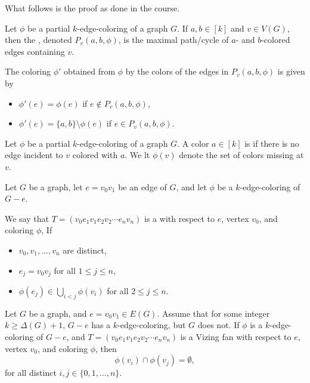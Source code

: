 What follows is the proof as done in the course.

\begin{definition}
    Let \(\phi\) be a partial \(k\)-edge-coloring of a graph \(G\).
    If \(a, b \in [k]\) and \(v \in V(G)\),
    then the ,
    denoted \(P_v(a, b, \phi)\),
    is the maximal path/cycle of \(a\)- and \(b\)-colored edges containing \(v\).
\end{definition}

\begin{definition}[Switching]
    The coloring \(\phi'\) obtained from \(\phi\) by  the colors of the edges in \(P_v(a, b, \phi)\) is given by
    \begin{itemize}
        \item \(\phi'(e) = \phi(e)\) if \(e \notin P_v(a, b, \phi)\),
        \item \(\phi'(e) = \{a, b\} \setminus \phi(e)\) if \(e \in P_v(a, b, \phi)\).
    \end{itemize}
\end{definition}

\begin{definition}
    Let \(\phi\) be a partial \(k\)-edge-coloring of a graph \(G\).
    A color \(a \in [k]\) is  if there is no edge incident to \(v\) colored with \(a\).
    We lt \(\phi(v)\) denote the set of colors missing at \(v\).
\end{definition}

\begin{definition}
    Let \(G\) be a graph,
    let \(e = v_0v_1\) be an edge of \(G\),
    and let \(\phi\) be a \(k\)-edge-coloring of \(G - e\).

    We say that \(T = (v_0e_1v_1e_2v_2 \cdots e_nv_n)\) is a  with respect to \(e\), vertex \(v_0\), and coloring \(\phi\), If
    \begin{itemize}
        \item \(v_0, v_1, \ldots, v_n\) are distinct,
        \item \(e_j = v_0v_j\) for all \(1 \leq j \leq n\),
        \item \(\phi(e_j) \in \bigcup_{i < j} \phi(v_i)\) for all \(2 \leq j \leq n\).
    \end{itemize}
\end{definition}

\begin{lemma} \label{lem:vizing-fan-disjoint-colors}
    Let \(G\) be a graph, and \(e = v_0v_1 \in E(G)\).
    Assume that for some integer \(k \geq \Delta(G) + 1\),
    \(G - e\) has a \(k\)-edge-coloring, but \(G\) does not.
    If \(\phi\) is a \(k\)-edge-coloring of \(G - e\),
    and \(T = (v_0e_1v_1e_2v_2 \cdots e_nv_n)\) is a Vizing fan
    with respect to \(e\), vertex \(v_0\), and coloring \(\phi\),
    then
    \begin{equation}
        \phi(v_i) \cap \phi(v_j) = \emptyset,
    \end{equation}
    for all distinct \(i, j \in \{0, 1, \ldots, n\}\).
\end{lemma}

